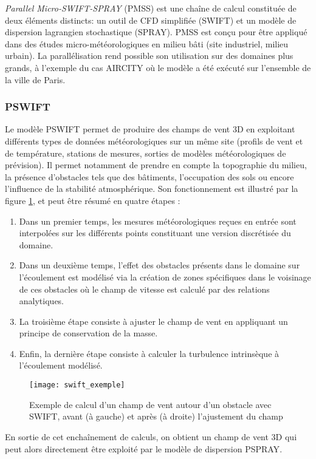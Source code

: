 \textit{Parallel Micro-SWIFT-SPRAY} (PMSS) est une chaîne de calcul constituée de deux éléments distincts: un outil de CFD simplifiée (SWIFT) et un modèle de dispersion lagrangien stochastique (SPRAY). {PMSS est conçu pour être appliqué} dans des études {micro-météorologiques en milieu bâti (site industriel, milieu urbain). La parallélisation rend possible son utilisation sur des domaines plus grands, à l'exemple du cas AIRCITY}\cite{Moussafir2014} où le modèle a été exécuté sur l'ensemble de la ville de Paris.\\

{
\subsubsection{PSWIFT}
}
Le modèle {PSWIFT} permet de produire des champs de vent 3D en exploitant différents types de données météorologiques sur un même site (profils de vent et de température, stations de mesures, sorties de modèles météorologiques de prévision). Il permet notamment de prendre en compte la topographie du milieu, la présence d'obstacles tels que des bâtiments, l'occupation des sols ou encore l'influence de la stabilité atmosphérique. Son fonctionnement {est illustré par la figure \ref{fig_swift_exemple}, et } peut être résumé en quatre étapes :  \\

\begin{enumerate}
	\item Dans un premier temps, les mesures météorologiques reçues en entrée sont interpolées sur les différents points constituant une version discrétisée du domaine.
	\item Dans un deuxième temps, l'effet des obstacles présents dans le domaine sur l'écoulement {est modélisé} via la création de zones spécifiques dans le voisinage de ces obstacles où le champ de vitesse est calculé {par des relations analytiques.}
	\item La troisième étape consiste à ajuster le champ de vent en appliquant un principe de conservation de la masse.
	\item Enfin, la dernière étape consiste à calculer la turbulence intrinsèque à l'écoulement modélisé.\\
\end{enumerate}

\begin{figure}[h!]
	\centering
	\texttt{[image: swift\_exemple]}
	\caption{Exemple de calcul d'un champ de vent autour d'un obstacle avec SWIFT, avant (à gauche) et après (à droite) l'ajustement du champ}
	\label{fig_swift_exemple}
\end{figure}
En sortie de cet enchaînement de calculs, on obtient un champ de vent 3D qui peut alors directement être exploité par le modèle de dispersion {PSPRAY}.


